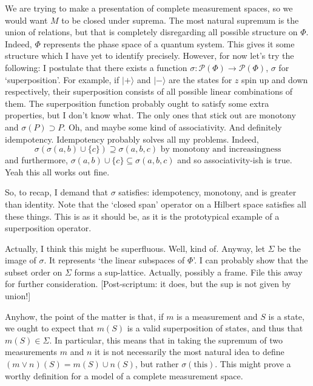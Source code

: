 \documentclass{article}
\theoremstyle{definition}
\theoremstyle{plain}
\newcommand{\ps}{\mathcal{P}}
\begin{document}
We are trying to make a presentation of complete measurement spaces, so we would want $M$ to be closed under suprema. The most natural supremum is the union of relations, but that is completely disregarding all possible structure on $\Phi$. Indeed, $\Phi$ represents the phase space of a quantum system. This gives it some structure which I have yet to identify precisely. However, for now let's try the following: I postulate that there exists a function $\sigma : \ps(\Phi) \to \ps(\Phi)$, $\sigma$ for `superposition'. For example, if $\lvert + \rangle$ and $\lvert - \rangle$ are the states for $z$ spin up and down respectively, their superposition consists of all possible linear combinations of them. The superposition function probably ought to satisfy some extra properties, but I don't know what. The only ones that stick out are monotony and $\sigma(P) \supset P$. Oh, and maybe some kind of associativity. And definitely idempotency. Idempotency probably solves all my problems. Indeed,
\[\sigma(\sigma(a,b) \cup \{c\}) \supseteq \sigma(a,b,c) \text{ by monotony and increasingness}\]
and furthermore, $\sigma(a,b) \cup \{c\} \subseteq \sigma(a,b,c)$ and so associativity-ish is true. Yeah this all works out fine.

So, to recap, I demand that $\sigma$ satisfies: idempotency, monotony, and is greater than identity. Note that the `closed span' operator on a Hilbert space satisfies all these things. This is as it should be, as it is the prototypical example of a superposition operator.

Actually, I think this might be superfluous. Well, kind of. Anyway, let $\Sigma$ be the image of $\sigma$. It represents `the linear subspaces of $\Phi$'. I can probably show that the subset order on $\Sigma$ forms a sup-lattice. Actually, possibly a frame. File this away for further consideration. [Post-scriptum: it does, but the sup is not given by union!]

Anyhow, the point of the matter is that, if $m$ is a measurement and $S$ is a state, we ought to expect that $m(S)$ is a valid superposition of states, and thus that $m(S) \in \Sigma$. In particular, this means that in taking the supremum of two measurements $m$ and $n$ it is not necessarily the most natural idea to define $(m \vee n)(S) = m(S) \cup n(S)$, but rather $\sigma(\text{this})$. This might prove a worthy definition for a model of a complete measurement space.
\end{document}
